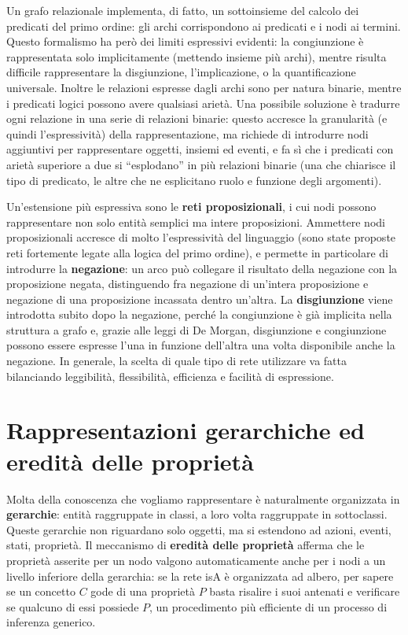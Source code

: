 \documentclass[11pt,a4paper]{report}
\begin{document}
Un grafo relazionale implementa, di fatto, un sottoinsieme del calcolo dei predicati del primo ordine: gli archi corrispondono ai predicati e i nodi ai termini. Questo formalismo ha però dei limiti espressivi evidenti: la congiunzione è rappresentata solo implicitamente (mettendo insieme più archi), mentre risulta difficile rappresentare la disgiunzione, l'implicazione, o la quantificazione universale. Inoltre le relazioni espresse dagli archi sono per natura binarie, mentre i predicati logici possono avere qualsiasi arietà. Una possibile soluzione è tradurre ogni relazione in una serie di relazioni binarie: questo accresce la granularità (e quindi l'espressività) della rappresentazione, ma richiede di introdurre nodi aggiuntivi per rappresentare oggetti, insiemi ed eventi, e fa sì che i predicati con arietà superiore a due si ``esplodano'' in più relazioni binarie (una che chiarisce il tipo di predicato, le altre che ne esplicitano ruolo e funzione degli argomenti).

Un'estensione più espressiva sono le \textbf{reti proposizionali}, i cui nodi possono rappresentare non solo entità semplici ma intere proposizioni. Ammettere nodi proposizionali accresce di molto l'espressività del linguaggio (sono state proposte reti fortemente legate alla logica del primo ordine), e permette in particolare di introdurre la \textbf{negazione}: un arco può collegare il risultato della negazione con la proposizione negata, distinguendo fra negazione di un'intera proposizione e negazione di una proposizione incassata dentro un'altra. La \textbf{disgiunzione} viene introdotta subito dopo la negazione, perché la congiunzione è già implicita nella struttura a grafo e, grazie alle leggi di De Morgan, disgiunzione e congiunzione possono essere espresse l'una in funzione dell'altra una volta disponibile anche la negazione. In generale, la scelta di quale tipo di rete utilizzare va fatta bilanciando leggibilità, flessibilità, efficienza e facilità di espressione.

\section{Rappresentazioni gerarchiche ed eredità delle proprietà}

Molta della conoscenza che vogliamo rappresentare è naturalmente organizzata in \textbf{gerarchie}: entità raggruppate in classi, a loro volta raggruppate in sottoclassi. Queste gerarchie non riguardano solo oggetti, ma si estendono ad azioni, eventi, stati, proprietà. Il meccanismo di \textbf{eredità delle proprietà} afferma che le proprietà asserite per un nodo valgono automaticamente anche per i nodi a un livello inferiore della gerarchia: se la rete isA è organizzata ad albero, per sapere se un concetto $C$ gode di una proprietà $P$ basta risalire i suoi antenati e verificare se qualcuno di essi possiede $P$, un procedimento più efficiente di un processo di inferenza generico.
\end{document}

